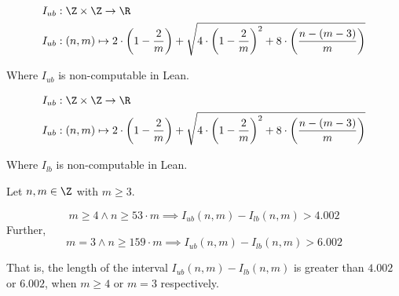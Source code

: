 
\begin{definition}[I ub]
    \label{def:I_ub}
    \leanok
    
    \begin{align*}
        I_{ub} &: \Z\times \Z \to \R \\
        I_{ub} &: (n,m) \mapsto 2 \cdot \left(1 - \frac{2}{m}\right) + \sqrt{4\cdot \left(1 - \frac{2}{m}\right)^2 + 8\cdot \left(\frac{n - (m - 3)}{m}\right)}
    \end{align*}

    Where $I_{ub}$ is non-computable in Lean.
\end{definition}

\begin{definition}[I lb]
    \label{def:I_lb}
    \leanok
    
    \begin{align*}
        I_{ub} &: \Z\times \Z \to \R \\
        I_{ub} &: (n,m) \mapsto 2 \cdot \left(1 - \frac{2}{m}\right) + \sqrt{4\cdot \left(1 - \frac{2}{m}\right)^2 + 8\cdot \left(\frac{n - (m - 3)}{m}\right)}
    \end{align*}

    Where $I_{lb}$ is non-computable in Lean.
\end{definition}

\begin{lemma}[Interval]
    \label{lem:interval}
    \leanok
    Let $n,m\in\Z$ with $m\geq 3$.

    \[
        m \geq 4 \land n \geq 53\cdot m \implies I_{ub}(n,m) - I_{lb}(n,m) > 4.002
    \]
    Further,
    \[
        m = 3\land n \geq 159\cdot m \implies I_{ub}(n,m) - I_{lb}(n,m) > 6.002
    \]

    That is, the length of the interval $I_{ub}(n,m) - I_{lb}(n,m)$ is greater than $4.002$ or $6.002$, when $m\geq 4$ or $m = 3$ respectively.
\end{lemma}

